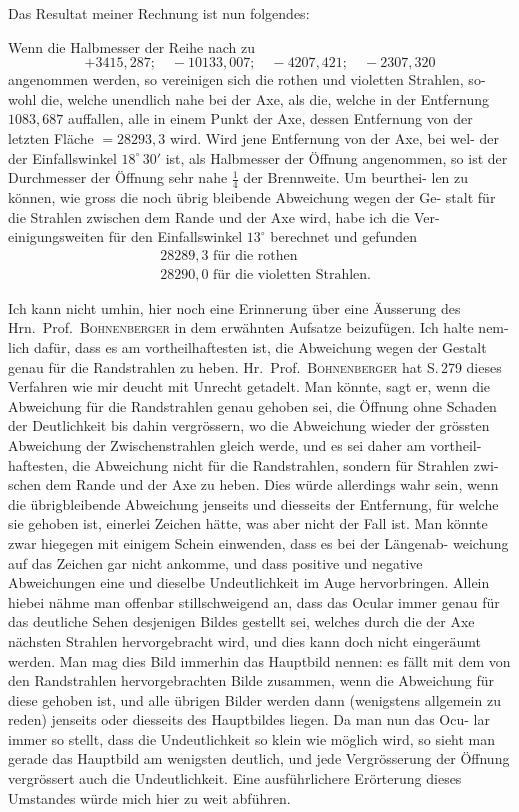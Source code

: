 \documentclass[12pt,a4paper]{article}
\begin{document}
Das Resultat meiner Rechnung ist nun folgendes:

Wenn die Halbmesser der Reihe nach zu
\[
+3415{,}287;\quad -10133{,}007;\quad -4207{,}421;\quad -2307{,}320
\]
angenommen werden, so vereinigen sich die rothen und violetten Strahlen, so-
wohl die, welche unendlich nahe bei der Axe, als die, welche in der Entfernung 
$1083{,}687$ auffallen, alle in einem Punkt der Axe, dessen Entfernung von der 
letzten Fläche $= 28293{,}3$ wird. Wird jene Entfernung von der Axe, bei wel-
der der Einfallswinkel $18^\circ\,30'$ ist, als Halbmesser der Öffnung angenommen, 
so ist der Durchmesser der Öffnung sehr nahe $\tfrac{1}{4}$ der Brennweite. Um beurthei-
len zu können, wie gross die noch übrig bleibende Abweichung wegen der Ge-
stalt für die Strahlen zwischen dem Rande und der Axe wird, habe ich die Ver-
einigungsweiten für den Einfallswinkel $13^\circ$ berechnet und gefunden
\begin{align*}
&28289{,}3\text{ für die rothen}\\
&28290{,}0\text{ für die violetten Strahlen.}
\end{align*}

Ich kann nicht umhin, hier noch eine Erinnerung über eine Äusserung des 
Hrn.\ Prof.\ \textsc{Bohnenberger} in dem erwähnten Aufsatze beizufügen. Ich halte nem-
lich dafür, dass es am vortheilhaftesten ist, die Abweichung wegen der Gestalt 
genau für die Randstrahlen zu heben. Hr.\ Prof.\ \textsc{Bohnenberger} hat S.\,279 dieses 
Verfahren wie mir deucht mit Unrecht getadelt. Man könnte, sagt er, wenn die 
Abweichung für die Randstrahlen genau gehoben sei, die Öffnung ohne Schaden 
der Deutlichkeit bis dahin vergrössern, wo die Abweichung wieder der grössten 
Abweichung der Zwischenstrahlen gleich werde, und es sei daher am vortheil-
haftesten, die Abweichung nicht für die Randstrahlen, sondern für Strahlen zwi-
schen dem Rande und der Axe zu heben. Dies würde allerdings wahr sein, 
wenn die übrigbleibende Abweichung jenseits und diesseits der Entfernung, für 
welche sie gehoben ist, einerlei Zeichen hätte, was aber nicht der Fall ist. Man 
könnte zwar hiegegen mit einigem Schein einwenden, dass es bei der Längenab-
weichung auf das Zeichen gar nicht ankomme, und dass positive und negative 
Abweichungen eine und dieselbe Undeutlichkeit im Auge hervorbringen. Allein 
hiebei nähme man offenbar stillschweigend an, dass das Ocular immer genau für 
das deutliche Sehen desjenigen Bildes gestellt sei, welches durch die der Axe 
nächsten Strahlen hervorgebracht wird, und dies kann doch nicht eingeräumt 
werden. Man mag dies Bild immerhin das Hauptbild nennen: es fällt mit dem 
von den Randstrahlen hervorgebrachten Bilde zusammen, wenn die Abweichung 
für diese gehoben ist, und alle übrigen Bilder werden dann (wenigstens allgemein 
zu reden) jenseits oder diesseits des Hauptbildes liegen. Da man nun das Ocu-
lar immer so stellt, dass die Undeutlichkeit so klein wie möglich wird, so sieht 
man gerade das Hauptbild am wenigsten deutlich, und jede Vergrösserung der 
Öffnung vergrössert auch die Undeutlichkeit. Eine ausführlichere Erörterung 
dieses Umstandes würde mich hier zu weit abführen.
\end{document}
